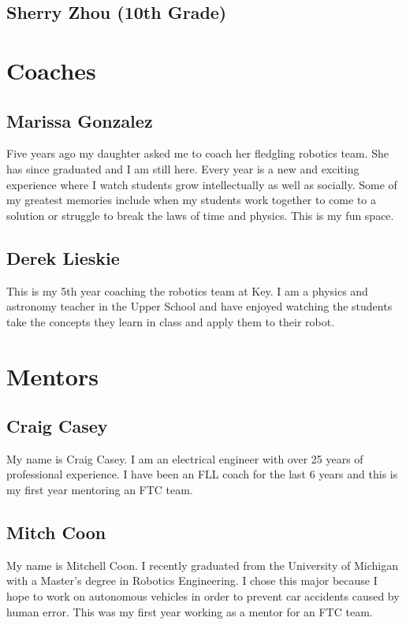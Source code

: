 \documentclass[12pt]{article}
\begin{document}
\subsection{Sherry Zhou (10th Grade)}

\section{Coaches}

\subsection{Marissa Gonzalez}
Five years ago my daughter asked me to coach her fledgling robotics team.  She has since graduated and I am still here.  Every year is a new and exciting experience where I watch students grow intellectually as well as socially.   Some of my greatest memories include when my students work together to come to a solution or struggle to break the laws of time and physics.  This is my fun space.

\subsection{Derek Lieskie}
This is my 5th year coaching the robotics team at Key.  I am a physics and astronomy teacher in the Upper School and have enjoyed watching the students take the concepts they learn in class and apply them to their robot. 

\section{Mentors}

\subsection{Craig Casey}
My name is Craig Casey. I am an electrical engineer with over 25 years of professional experience. I have been an FLL coach for the last 6 years and this is my first year mentoring an FTC team. 

\subsection{Mitch Coon}
My name is Mitchell Coon. I recently graduated from the University of Michigan with a Master’s degree in Robotics Engineering. I chose this major because I hope to work on autonomous vehicles in order to prevent car accidents caused by human error. This was my first year working as a mentor for an FTC team.
\end{document}
